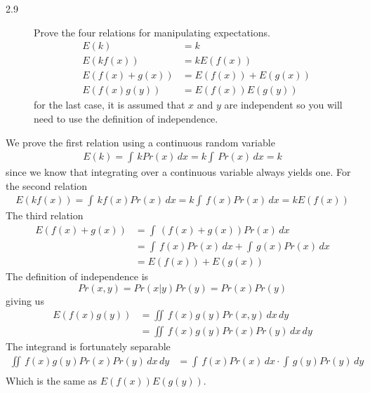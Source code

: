 \documentclass[10pt,a4paper]{article}
\newenvironment{prob}[1]%
   {%
    \begin{description}\item[#1]}%
   {\end{description}}
\begin{document}
\begin{prob}{2.9}
  Prove the four relations for manipulating expectations.
  \begin{align}
    E(k) &= k\\
    E(kf(x)) &= kE(f(x))\\
    E(f(x) + g(x)) &= E(f(x)) + E(g(x))\\
    E(f(x)g(y)) &= E(f(x))E(g(y))
  \end{align}
  for the last case, it is assumed that $x$ and $y$ are independent so
  you will need to use the definition of independence.
\end{prob}
We prove the first relation using a continuous random variable
\begin{align}
  E(k) = \int\,kPr(x)\,dx = k\int\,Pr(x)\,dx=k
\end{align}
since we know that integrating over a continuous variable always
yields one. For the second relation
\begin{align}
  E(kf(x)) = \int\,kf(x)Pr(x)\,dx = k\int\,f(x)Pr(x)\,dx = kE(f(x))
\end{align}
The third relation
\begin{align}
  E(f(x) + g(x)) &= \int\,(f(x) + g(x))Pr(x)\,dx\\
  &= \int\,f(x)Pr(x)\,dx + \int\,g(x)Pr(x)\,dx\\
  &= E(f(x)) + E(g(x))
\end{align}
The definition of independence is
\begin{equation}
  Pr(x, y)=Pr(x|y)Pr(y) = Pr(x)Pr(y)
\end{equation}
giving us
\begin{align}
  E(f(x)g(y)) &= \iint\,f(x)g(y)Pr(x,y)\,dx\,dy \\
  &= \iint\,f(x)g(y)Pr(x)Pr(y)\,dx\,dy
\end{align}
The integrand is fortunately separable
\begin{align}
  \iint\,f(x)g(y)Pr(x)Pr(y)\,dx\,dy &= \int\,f(x)Pr(x)\,dx\cdot\int\,g(y)Pr(y)\,dy\\
\end{align}
Which is the same as $E(f(x))E(g(y))$.
\end{document}

